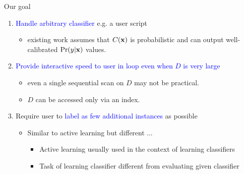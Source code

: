 \documentclass[usenames,dvipsnames, 11pt]{beamer}
\newcommand{\vek}[1]{{\bf {#1}}}
\newcommand{\vx}{{\vek{x}}}
\newlength{\wideitemsep}
\let\olditem\item
\renewcommand{\item}{\setlength{\itemsep}{\wideitemsep}\olditem}
\begin{document}
\begin{frame}{Our goal}
\begin{enumerate}
\pause
\item \textcolor{Blue}{Handle arbitrary classifier} e.g. a user script
  \begin{itemize}
  \item existing work assumes that $C(\vx)$ is probabilistic and can output well-calibrated $\Pr(y|\vx)$ values.
  \end{itemize}
  \pause
\item \textcolor{Blue}{Provide interactive speed to user in loop even when $D$ is very large}
  \begin{itemize}
  \item even a single sequential scan on $D$ may not be practical. 
  \item $D$ can be accessed only via an index.
  \end{itemize}
  \pause
\item Require user to \textcolor{Blue}{label as few additional instances} as possible
  \begin{itemize}
  \item Similar to active learning but different ...
  \begin{itemize}
  \item Active learning usually used in the context of learning classifiers
  \item Task of learning classifier different from evaluating given classifier
  \end{itemize}
  \end{itemize}
  \end{enumerate}
\end{frame}
\end{document}

